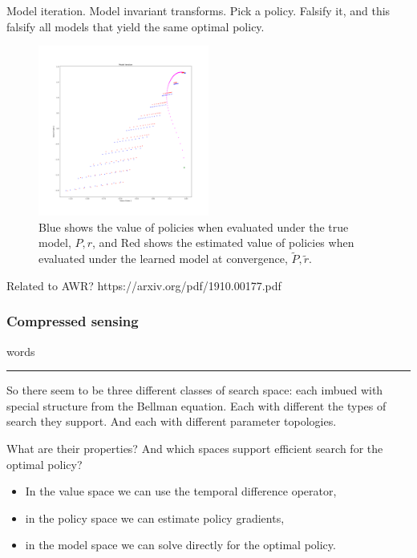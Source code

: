 Model iteration. Model invariant transforms. Pick a policy. Falsify it,
and this falsify all models that yield the same optimal policy.

\begin{figure}
\centering
\includegraphics[width=0.5\textwidth,height=0.5\textheight]{../../pictures/figures/model_iteration.png}
\caption{Blue shows the value of policies when evaluated under the true model, $P, r$,
and Red shows the estimated value of policies when evaluated under the learned model at convergence, $\tilde P, \tilde r$.}
\end{figure}


Related to AWR? https://arxiv.org/pdf/1910.00177.pdf

\subsubsection{Compressed sensing}

words



\begin{center}\rule{0.5\linewidth}{\linethickness}\end{center}

So there seem to be three different classes of search space: each imbued with special
structure from the Bellman equation. Each with different the types of search they
support. And each with different parameter topologies.

What are their properties? And which spaces support efficient search for the optimal policy?

\begin{itemize}
\tightlist
\item
  In the value space we can use the temporal difference operator,
\item
  in the policy space we can estimate policy gradients,
\item
  in the model space we can solve directly for the optimal policy.
\end{itemize}

